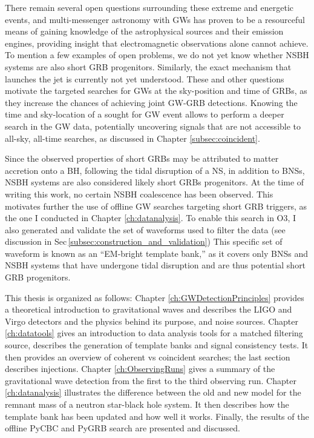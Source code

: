 \documentclass[binding=0.6cm, LaM]{sapthesis}
\begin{document}
	There remain several open questions surrounding these extreme and energetic events, 
	and multi-messenger astronomy with GWs has proven to be a resourceful means of gaining 
	knowledge of the astrophysical sources and their emission engines, 
	providing insight that electromagnetic observations alone cannot achieve.
	To mention a few examples of open problems, we do not yet know whether NSBH systems are also short GRB progenitors.  
	Similarly, the exact mechanism that launches the jet is currently not yet understood.
        These and other questions motivate the targeted searches for GWs at the sky-position and time of GRBs, 
	as they increase the chances of achieving joint GW-GRB detections.
	Knowing the time and sky-location of a sought for GW event
	allows to perform a deeper search in the GW data, potentially uncovering signals 
	that are not accessible to all-sky, all-time searches, as discussed in Chapter \ref{subsec:coincident}.

	Since the observed properties of short GRBs may be attributed to matter accretion onto a BH,
	following the tidal disruption of a NS, in addition to BNSs, NSBH systems are also considered likely short GRBs progenitors.
	At the time of writing this work, no certain NSBH coalescence has been observed.
	This motivates further the use of 
	offline GW searches targeting short GRB triggers, as the one I conducted in Chapter \ref{ch:datanalysis}.
	To enable this search in O3, I also generated and validate the set of waveforms used to filter the data (see discussion in Sec\,\ref{subsec:construction_and_validation})
	This specific set of waveform is known as an ``EM-bright template bank,'' 
	as it covers only BNSs and NSBH systems that have undergone tidal disruption and are thus potential short GRB progenitors.

	This thesis is organized as follows: Chapter \ref{ch:GWDetectionPrinciples} provides a theoretical introduction to gravitational waves and 
	describes the LIGO and Virgo detectors and the physics behind its purpose, and noise sources.
	Chapter \ref{ch:datatools} gives an introduction to data analysis tools for a matched filtering source, 
	describes the generation of template banks and signal consistency tests.
	It then provides an overview of coherent vs coincident searches; the last section describes injections.
	Chapter \ref{ch:ObservingRuns} gives a summary of the gravitational wave detection from the first to the third observing run.
	Chapter \ref{ch:datanalysis} illustrates the difference between the old and new model for the remnant mass of a neutron star-black hole system.
	It then describes how the template bank has been updated and how well it works.
	Finally, the results of the offline {\ttfamily PyCBC} and {\ttfamily PyGRB} search are presented and discussed.
\end{document}
